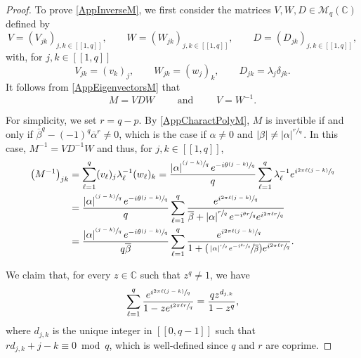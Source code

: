 \documentclass[10pt]{amsart}
\newcommand{\psfrac}[2]{\sfrac{(#1)}{#2}}
\newcommand{\Psfrac}[2]{(\sfrac{#1}{#2})}
\newcommand{\llbracket}{[\![}
\newcommand{\rrbracket}{]\!]}
\theoremstyle{plain}
\theoremstyle{definition}
\newcommand{\abs}[1]{\left\lvert #1\right \rvert}
\begin{document}
\begin{proof}
To prove \eqref{AppInverseM}, we first consider the matrices $V, W, D \in \mathcal M_{q}(\mathbb C)$ defined by
\[
V = (V_{jk})_{j, k \in \llbracket 1, q\rrbracket}, \qquad W = (W_{jk})_{j, k \in \llbracket 1, q\rrbracket}, \qquad D = (D_{jk})_{j, k \in \llbracket 1, q\rrbracket},
\]
with, for $j, k \in \llbracket 1, q\rrbracket$
\[
V_{jk} = (v_k)_j, \qquad W_{jk} = (w_j)_k, \qquad D_{jk} = \lambda_j \delta_{jk}.
\]
It follows from \eqref{AppEigenvectorsM} that
\[
M = V D W \qquad \text{ and } \qquad V = W^{-1}.
\]

For simplicity, we set $r\!=\!q - p$. By \eqref{AppCharactPolyM}, $M$ is invertible if and only if \hbox{$\overline\beta^q\!-\!(-1)^q \overline\alpha^r\!\neq\!0$}, which is the case if $\alpha \neq 0$ and $\abs{\beta} \neq \abs{\alpha}^{\sfrac{r}{q}}$. In this case, $M^{-1} = V D^{-1} W$ and thus, for $j, k \in \llbracket 1, q\rrbracket$,
\begin{equation}
\label{DevelopMMinus1}
\begin{aligned}
\left(M^{-1}\right)_{jk} & = \sum_{\ell=1}^q (v_\ell)_j \lambda_\ell^{-1} (w_\ell)_k = \frac{\abs{\alpha}^{\psfrac{j-k}{q}} e^{-i\theta\psfrac{j-k}{q}}}{q} \sum_{\ell=1}^q \lambda_\ell^{-1} e^{i \sfrac{2\pi \ell (j - k)}{q}}\\
& = \frac{\abs{\alpha}^{\psfrac{j-k}{q}} e^{-i\theta\psfrac{j-k}{q}}}{q} \sum_{\ell=1}^q \frac{e^{i \sfrac{2\pi \ell (j - k)}{q}}}{\overline\beta + \abs{\alpha}^{\sfrac{r}{q}} e^{-i\sfrac{\theta r}{q}} e^{i \sfrac{2\pi \ell r}{q}}}\\
&= \frac{\abs{\alpha}^{\psfrac{j-k}{q}} e^{-i\theta\psfrac{j-k}{q}}}{q \overline\beta} \sum_{\ell=1}^q \frac{e^{i \sfrac{2\pi \ell (j - k)}{q}}}{1 + \Psfrac{\abs{\alpha}^{\sfrac{r}{q}} e^{-i\sfrac{\theta r}{q}}}{\overline\beta} e^{i \sfrac{2\pi \ell r}{q}}}.
\end{aligned}
\end{equation}

We claim that, for every $z \in \mathbb C$ such that $z^q \neq 1$, we have
\begin{equation}
\label{CalculSommeMeromorphe}
\sum_{\ell=1}^q \frac{e^{i \sfrac{2\pi \ell (j - k)}{q}}}{1 - z e^{i \sfrac{2 \pi \ell r}{q}}} = \frac{q z^{d_{j, k}}}{1 - z^q},
\end{equation}
where $d_{j, k}$ is the unique integer in $\llbracket 0, q-1\rrbracket$ such that $r d_{j, k} + j - k \equiv 0 \bmod q$, which is well-defined since $q$ and $r$ are coprime.


\end{proof}
\end{document}
